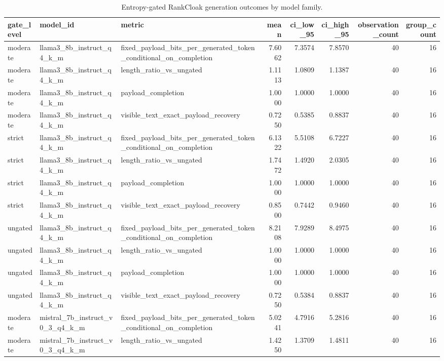 \begin{table}
\caption{Entropy-gated RankCloak generation outcomes by model family.}
\label{tab:entropy-gate-by-model}
\begin{tabular}{lllrrrrr}
\toprule
gate\_level & model\_id & metric & mean & ci\_low\_95 & ci\_high\_95 & observation\_count & group\_count \\
\midrule
moderate & llama3\_8b\_instruct\_q4\_k\_m & fixed\_payload\_bits\_per\_generated\_token\_conditional\_on\_completion & 7.6062 & 7.3574 & 7.8570 & 40 & 16 \\
moderate & llama3\_8b\_instruct\_q4\_k\_m & length\_ratio\_vs\_ungated & 1.1113 & 1.0809 & 1.1387 & 40 & 16 \\
moderate & llama3\_8b\_instruct\_q4\_k\_m & payload\_completion & 1.0000 & 1.0000 & 1.0000 & 40 & 16 \\
moderate & llama3\_8b\_instruct\_q4\_k\_m & visible\_text\_exact\_payload\_recovery & 0.7250 & 0.5385 & 0.8837 & 40 & 16 \\
strict & llama3\_8b\_instruct\_q4\_k\_m & fixed\_payload\_bits\_per\_generated\_token\_conditional\_on\_completion & 6.1322 & 5.5108 & 6.7227 & 40 & 16 \\
strict & llama3\_8b\_instruct\_q4\_k\_m & length\_ratio\_vs\_ungated & 1.7472 & 1.4920 & 2.0305 & 40 & 16 \\
strict & llama3\_8b\_instruct\_q4\_k\_m & payload\_completion & 1.0000 & 1.0000 & 1.0000 & 40 & 16 \\
strict & llama3\_8b\_instruct\_q4\_k\_m & visible\_text\_exact\_payload\_recovery & 0.8500 & 0.7442 & 0.9460 & 40 & 16 \\
ungated & llama3\_8b\_instruct\_q4\_k\_m & fixed\_payload\_bits\_per\_generated\_token\_conditional\_on\_completion & 8.2108 & 7.9289 & 8.4975 & 40 & 16 \\
ungated & llama3\_8b\_instruct\_q4\_k\_m & length\_ratio\_vs\_ungated & 1.0000 & 1.0000 & 1.0000 & 40 & 16 \\
ungated & llama3\_8b\_instruct\_q4\_k\_m & payload\_completion & 1.0000 & 1.0000 & 1.0000 & 40 & 16 \\
ungated & llama3\_8b\_instruct\_q4\_k\_m & visible\_text\_exact\_payload\_recovery & 0.7250 & 0.5384 & 0.8837 & 40 & 16 \\
moderate & mistral\_7b\_instruct\_v0\_3\_q4\_k\_m & fixed\_payload\_bits\_per\_generated\_token\_conditional\_on\_completion & 5.0241 & 4.7916 & 5.2816 & 40 & 16 \\
moderate & mistral\_7b\_instruct\_v0\_3\_q4\_k\_m & length\_ratio\_vs\_ungated & 1.4250 & 1.3709 & 1.4811 & 40 & 16 \\

\end{tabular}
\end{table}
